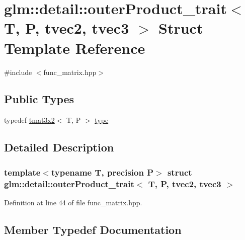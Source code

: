 \hypertarget{structglm_1_1detail_1_1outer_product__trait_3_01_t_00_01_p_00_01tvec2_00_01tvec3_01_4}{}\section{glm\+::detail\+::outer\+Product\+\_\+trait$<$ T, P, tvec2, tvec3 $>$ Struct Template Reference}
\label{structglm_1_1detail_1_1outer_product__trait_3_01_t_00_01_p_00_01tvec2_00_01tvec3_01_4}


{\ttfamily \#include $<$func\+\_\+matrix.\+hpp$>$}

\subsection*{Public Types}
\begin{DoxyCompactItemize}
\item 
typedef \mbox{\hyperlink{structglm_1_1tmat3x2}{tmat3x2}}$<$ T, P $>$ \mbox{\hyperlink{structglm_1_1detail_1_1outer_product__trait_3_01_t_00_01_p_00_01tvec2_00_01tvec3_01_4_a5b6c145bc27bf3a7d04336c578363bf7}{type}}
\end{DoxyCompactItemize}


\subsection{Detailed Description}
\subsubsection*{template$<$typename T, precision P$>$\newline
struct glm\+::detail\+::outer\+Product\+\_\+trait$<$ T, P, tvec2, tvec3 $>$}



Definition at line 44 of file func\+\_\+matrix.\+hpp.



\subsection{Member Typedef Documentation}
\mbox{\label{structglm_1_1detail_1_1outer_product__trait_3_01_t_00_01_p_00_01tvec2_00_01tvec3_01_4_a5b6c145bc27bf3a7d04336c578363bf7}} 
